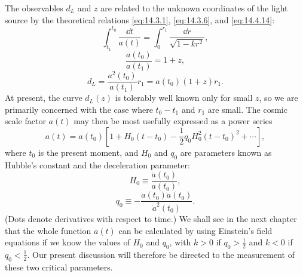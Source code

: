 The observables \(d_L\) and \(z\) are related to the unknown coordinates of
the light source by the theoretical relations \eqref{eq:14.3.1},
\eqref{eq:14.3.6}, and \eqref{eq:14.4.14}:
\[
  \int_{t_1}^{t_0}\frac{\dd t}{a(t)}
  =
  \int_0^{r_1}\frac{\dd r}{\sqrt{1-kr^2}},
\]
\[
  \frac{a(t_0)}{a(t_1)}=1+z,
\]
\[
  d_L
  =
  \frac{a^2(t_0)}{a(t_1)}r_1
  =
  a(t_0)(1+z)r_1.
\]
At present, the curve \(d_L(z)\) is tolerably well known only for small
\(z\), so we are primarily concerned with the case where \(t_0-t_1\) and
\(r_1\) are small. The cosmic scale factor \(a(t)\) may then be most
usefully expressed as a power series
\begin{equation}
  a(t)
  =
  a(t_0)
  \left[
    1+H_0(t-t_0)
    -\frac12 q_0H_0^2(t-t_0)^2
    +\cdots
  \right],
  \tag{14.6.1}\label{eq:14.6.1}
\end{equation}
where \(t_0\) is the present moment, and \(H_0\) and \(q_0\) are parameters
known as Hubble's constant and the deceleration parameter:
\begin{equation}
  H_0\equiv\frac{\dot a(t_0)}{a(t_0)},
  \tag{14.6.2}\label{eq:14.6.2}
\end{equation}
\begin{equation}
  q_0\equiv-\frac{a(t_0)\ddot a(t_0)}{\dot a^2(t_0)}.
  \tag{14.6.3}\label{eq:14.6.3}
\end{equation}
(Dots denote derivatives with respect to time.) We shall see in the next
chapter that the whole function \(a(t)\) can be calculated by using
Einstein's field equations if we know the values of \(H_0\) and \(q_0\),
with \(k>0\) if \(q_0>\tfrac12\) and \(k<0\) if \(q_0<\tfrac12\). Our
present discussion will therefore be directed to the measurement of these
two critical parameters.


